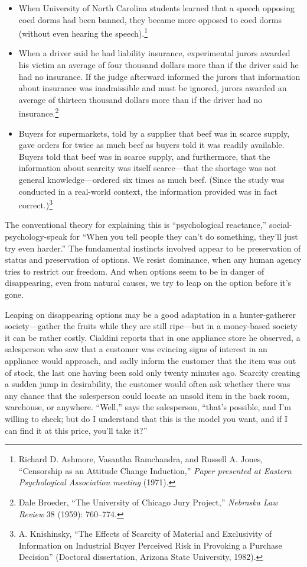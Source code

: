 \begin{itemize}
\item {
 When University of North Carolina students learned that a speech
opposing coed dorms had been banned, they became more opposed to coed
dorms (without even hearing the speech).\footnote{Richard D. Ashmore, Vasantha Ramchandra, and Russell A. Jones,
``Censorship as an Attitude Change
Induction,'' \textit{Paper presented at Eastern
Psychological Association meeting} (1971).}}

\item {
 When a driver said he had liability insurance, experimental jurors
awarded his victim an average of four thousand dollars more than if the
driver said he had no insurance. If the judge afterward informed the
jurors that information about insurance was inadmissible and must be
ignored, jurors awarded an average of thirteen thousand dollars more
than if the driver had no insurance.\footnote{Dale Broeder, ``The University of Chicago Jury
Project,'' \textit{Nebraska Law Review} 38 (1959):
760--774.}}

\item {
 Buyers for supermarkets, told by a supplier that beef was in
scarce supply, gave orders for twice as much beef as buyers told it was
readily available. Buyers told that beef was in scarce supply, and
furthermore, that the information about scarcity was itself
scarce---that the shortage was not general knowledge---ordered six
times as much beef. (Since the study was conducted in a real-world
context, the information provided was in fact
correct.)\footnote{A. Knishinsky, ``The Effects of Scarcity of
Material and Exclusivity of Information on Industrial Buyer Perceived
Risk in Provoking a Purchase Decision'' (Doctoral
dissertation, Arizona State University, 1982).}}
\end{itemize}

{
 The conventional theory for explaining this is
``psychological reactance,''
social-psychology-speak for ``When you tell people
they can't do something, they'll just
try even harder.'' The fundamental instincts involved
appear to be preservation of status and preservation of options. We
resist dominance, when any human agency tries to restrict our freedom.
And when options seem to be in danger of disappearing, even from
natural causes, we try to leap on the option before
it's gone.}

{
 Leaping on disappearing options may be a good adaptation in a
hunter-gatherer society---gather the fruits while they are still
ripe---but in a money-based society it can be rather costly. Cialdini
reports that in one appliance store he observed, a salesperson who saw
that a customer was evincing signs of interest in an appliance would
approach, and sadly inform the customer that the item was out of stock,
the last one having been sold only twenty minutes ago. Scarcity
creating a sudden jump in desirability, the customer would often ask
whether there was any chance that the salesperson could locate an
unsold item in the back room, warehouse, or anywhere.
``Well,'' says the salesperson,
``that's possible, and
I'm willing to check; but do I understand that this is
the model you want, and if I can find it at this price,
you'll take it?''}

